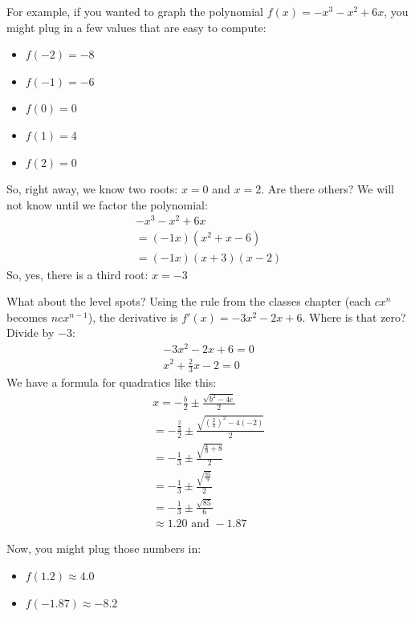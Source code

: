 
For example, if you wanted to graph the polynomial $f(x) = -x^3 -x^2 +
6x$, you might plug in a few values that are easy to compute:

\begin{itemize}
\item $f(-2) = -8$
\item $f(-1) = -6$
\item $f(0) = 0$
\item $f(1) = 4$
\item $f(2) = 0$ 
\end{itemize}

So, right away, we know two roots: $x = 0$ and $x = 2$. Are there
others? We will not know until we factor the polynomial:
\begin{multline*}
  -x^3 -x^2 + 6x \\
  = (-1x)(x^2 + x - 6) \\
  = (-1x)(x + 3)(x - 2)
\end{multline*}
So, yes, there is a third root: $x = -3$

What about the level spots? Using the rule from the classes chapter (each
$cx^n$ becomes $ncx^{n-1}$), the derivative is $f'(x) = -3x^2 - 2x + 6$.
Where is that zero? Divide by $-3$:
\begin{multline*}
  -3x^2 -2x + 6 = 0 \\
  x^2 + \frac{2}{3}x - 2 = 0
\end{multline*}
We have a formula for quadratics like this:
\begin{multline*}
  x = -\frac{b}{2} \pm \frac{\sqrt{b^2 - 4c}}{2} \\
  = -\frac{\frac{2}{3}}{2} \pm \frac{\sqrt{\left(\frac{2}{3}\right)^2 - 4(-2)}}{2} \\
  = -\frac{1}{3} \pm \frac{\sqrt{\frac{4}{9} + 8}}{2} \\
  = -\frac{1}{3} \pm \frac{\sqrt{\frac{85}{9}}}{2} \\
  = -\frac{1}{3} \pm \frac{\sqrt{85}}{6} \\
  \approx 1.20 \text{ and } -1.87 
\end{multline*}

Now, you might plug those numbers in:
\begin{itemize}
\item $f(1.2) \approx 4.0 $
\item $f(-1.87) \approx -8.2$
\end{itemize}

